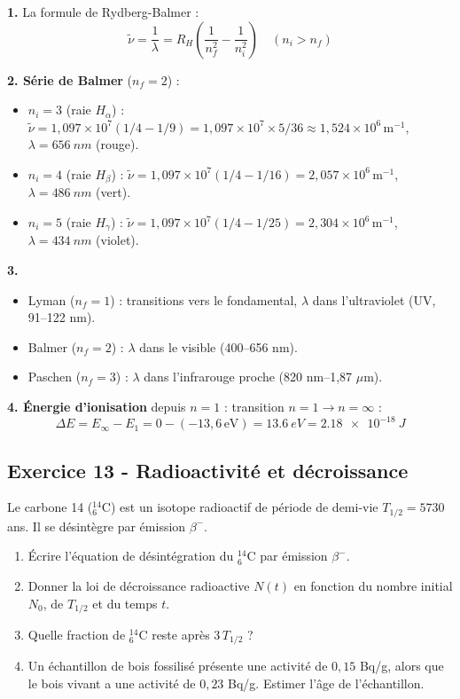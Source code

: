 \documentclass[12pt,a4paper]{article}
\begin{document}
\begin{boitecorrige}
\textbf{1.} La formule de Rydberg-Balmer :
\[
\tilde{\nu} = \frac{1}{\lambda} = R_H\left(\frac{1}{n_f^2} - \frac{1}{n_i^2}\right) \quad (n_i > n_f)
\]

\textbf{2. Série de Balmer} ($n_f = 2$) :
\begin{itemize}[nosep]
  \item $n_i = 3$ (raie $H_\alpha$) : $\tilde{\nu} = 1{,}097\times10^7(1/4 - 1/9) = 1{,}097\times10^7\times5/36 \approx 1{,}524\times10^6\,\text{m}^{-1}$, $\lambda = \qty{656}{nm}$ (rouge).
  \item $n_i = 4$ (raie $H_\beta$) : $\tilde{\nu} = 1{,}097\times10^7(1/4-1/16) = 2{,}057\times10^6\,\text{m}^{-1}$, $\lambda = \qty{486}{nm}$ (vert).
  \item $n_i = 5$ (raie $H_\gamma$) : $\tilde{\nu} = 1{,}097\times10^7(1/4-1/25) = 2{,}304\times10^6\,\text{m}^{-1}$, $\lambda = \qty{434}{nm}$ (violet).
\end{itemize}

\textbf{3.}
\begin{itemize}[nosep]
  \item Lyman ($n_f=1$) : transitions vers le fondamental, $\lambda$ dans l'ultraviolet (UV, 91--122 nm).
  \item Balmer ($n_f=2$) : $\lambda$ dans le visible (400--656 nm).
  \item Paschen ($n_f=3$) : $\lambda$ dans l'infrarouge proche (820 nm--1,87 $\mu$m).
\end{itemize}

\textbf{4. Énergie d'ionisation} depuis $n=1$ : transition $n=1 \to n=\infty$ :
\[
\Delta E = E_\infty - E_1 = 0 - (-13{,}6\,\text{eV}) = \qty{13.6}{eV} = \qty{2.18e-18}{J}
\]
\end{boitecorrige}

\subsection*{Exercice 13 - Radioactivité et décroissance \niveau{\moyen}}

\begin{boiteexercice}
Le carbone 14 ($^{14}_6$C) est un isotope radioactif de période de demi-vie $T_{1/2} = 5730$ ans. Il se désintègre par émission $\beta^-$.
\begin{enumerate}
  \item Écrire l'équation de désintégration du $^{14}_6$C par émission $\beta^-$.
  \item Donner la loi de décroissance radioactive $N(t)$ en fonction du nombre initial $N_0$, de $T_{1/2}$ et du temps $t$.
  \item Quelle fraction de $^{14}_6$C reste après $3\,T_{1/2}$ ?
  \item Un échantillon de bois fossilisé présente une activité de $0{,}15$ Bq/g, alors que le bois vivant a une activité de $0{,}23$ Bq/g. Estimer l'âge de l'échantillon.
\end{enumerate}
\end{boiteexercice}
\end{document}
